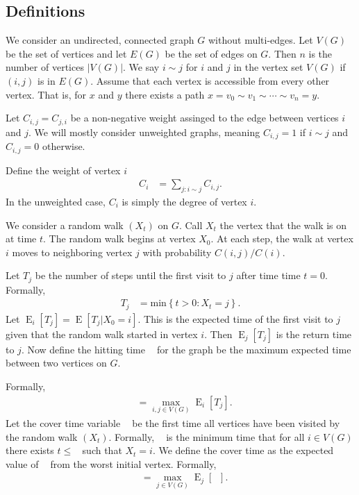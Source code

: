 \documentclass[12pt]{article}
\theoremstyle{definition}
\DeclareMathOperator{\E}{\mathrm{E}}		     %
\DeclareMathOperator{\cov}{\uptau_\textrm{cov}}  %
\DeclareMathOperator{\tcov}{t_\textrm{cov}}      %
\DeclareMathOperator{\hit}{t_{\textrm{hit}}}     %
\begin{document}
\subsection{Definitions}
We consider an undirected, connected graph $G$ without multi-edges.
Let $V(G)$ be the set of vertices and let $E(G)$ be the set of edges on $G$.
Then $n$ is the number of vertices $|V(G)|$.
We say $i\sim j$ for $i$ and $j$ in the vertex set $V(G)$ if $(i,j)$ 
is in $E(G)$.
Assume that each vertex is accessible from every other vertex.
That is, for $x$ and $y$ there exists a path
$x=v_0 \sim v_1 \sim \cdots \sim v_n = y$.

Let $C_{i,j}=C_{j,i}$ be a non-negative weight assinged to the edge
between vertices $i$ and $j$.
We will mostly consider unweighted graphs,
meaning $C_{i,j} = 1$ if $i \sim j$ and $C_{i,j} = 0$ otherwise.

Define the weight of vertex $i$ 
\begin{align}
C_i &= \sum_{j:i \sim j} C_{i,j}. \nonumber
\end{align}
In the unweighted case, $C_i$ is simply the degree of vertex $i$.

We consider a random walk $(X_t)$ on $G$.
Call $X_t$ the vertex that the walk is on at time $t$.
The random walk begins at vertex $X_0$.
At each step, the walk at vertex $i$ moves to neighboring vertex
$j$ with probability $C(i,j)/C(i)$.

Let $T_{j}$ be the number of steps until the first visit to $j$
after time time $t=0$.
Formally,
\begin{align}
T_{j} &= \textrm{min} \left\{t > 0 : X_t = j \right\}. \nonumber
\end{align}
Let $\E_i[T_j] = \E[T_j | X_0 = i]$.
This is the expected time of the first visit to $j$ given
that the random walk started in vertex $i$.
Then $\E_j[T_j]$ is the return time to $j$.
Now define the hitting time $\hit$ for the graph
be the maximum expected time between two vertices on $G$.

Formally, 
\begin{align}
\hit &= \max_{i,j \in V(G)} \E_i[T_j]. \nonumber
\end{align}
Let the cover time variable $\cov$ be the first time all vertices have been
visited by the random walk $(X_t)$.
Formally, $\cov$ is the minimum time that for all $i \in V(G)$
there exists $t \leq \cov$ such that $X_t = i$.
We define the cover time as the expected value of $\cov$ from
the worst initial vertex.
Formally,
\begin{align}
\tcov &= \max_{j \in V(G)} \E_j[\cov] . \nonumber
\end{align}
\end{document}
